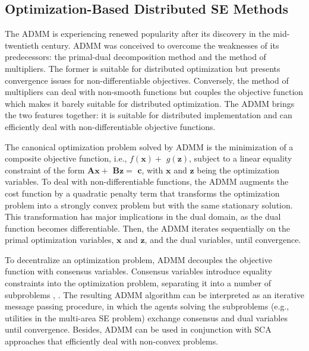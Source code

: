 \documentclass[journal]{IEEEtran}
\begin{document}
\subsection{Optimization-Based Distributed SE Methods}

The ADMM is experiencing renewed popularity after its discovery in the mid-twentieth century. ADMM was conceived to overcome the weaknesses of its predecessors: the primal-dual decomposition method and the method of multipliers. The former is suitable for distributed optimization but presents convergence issues for non-differentiable objectives. Conversely, the method of multipliers can deal with non-smooth functions but couples the objective function which makes it barely suitable for distributed optimization. The ADMM brings the two features together: it is suitable for distributed implementation and can efficiently deal with non-differentiable objective functions. 

The canonical optimization problem solved by ADMM is the minimization of a composite objective function, i.e., $f(\mathbf x)+$ $g(\mathbf z)$, subject to a linear equality constraint of the form $\mathbf {Ax}+$ $\mathbf {Bz} = $ $\mathbf {c}$, with $\mathbf x$ and $\mathbf z$ being the optimization variables.  To deal with non-differentiable functions, the ADMM augments the cost function by a quadratic penalty term that transforms the optimization problem into a strongly convex problem but with the same stationary solution. This transformation has major implications in the dual domain, as the dual function becomes differentiable. Then, the ADMM iterates sequentially on the primal optimization variables, $\mathbf x$ and $\mathbf z$, and the dual variables, until convergence. 

To decentralize an optimization problem, ADMM decouples the objective function with consensus variables. Consensus variables introduce equality constraints into the optimization problem, separating it into a number of subproblems \cite{giannakis}, \cite{haro}. The resulting ADMM algorithm can be interpreted as an iterative message passing procedure, in which the agents solving the subproblems (e.g., utilities in the multi-area SE problem) exchange consensus and dual variables until convergence.  Besides, ADMM can be used in conjunction with SCA approaches that efficiently deal with non-convex problems. 
\end{document}
